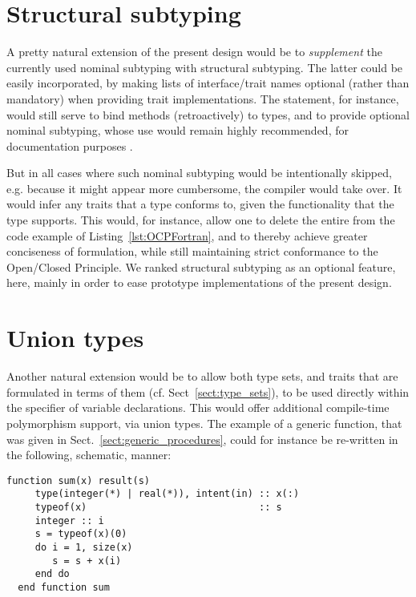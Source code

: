 \documentclass[11pt,oneside]{report}
\newcommand{\code}[1]{{\selectfont\ttfamily{#1}}}
\begin{document}
\section{Structural subtyping}
\label{sect:structural_subtyping}

A pretty natural extension of the present design would be to
\emph{supplement} the currently used nominal subtyping with
structural subtyping. The latter could be easily incorporated, by
making lists of interface/trait names optional (rather than mandatory)
when providing trait implementations. The \code{implements} statement,
for instance, would still serve to bind methods (retroactively) to
types, and to provide optional nominal subtyping, whose use would
remain highly recommended, for documentation purposes \cite{MojoRef}.

But in all cases where such nominal subtyping would be intentionally
skipped, e.g. because it might appear more cumbersome, the compiler
would take over. It would infer any traits that a type conforms to,
given the functionality that the type supports. This would, for
instance, allow one to delete the entire \code{module intrinsics} from
the code example of Listing~\ref{lst:OCPFortran}, and to thereby
achieve greater conciseness of formulation, while still maintaining
strict conformance to the Open/Closed Principle. We ranked structural
subtyping as an optional feature, here, mainly in order to ease
prototype implementations of the present design.

\section{Union types}
\label{sect:union_types}

Another natural extension would be to allow both type sets, and
traits that are formulated in terms of them
(cf. Sect~\ref{sect:type_sets}), to be used directly within the
\code{type} specifier of variable declarations. This would offer
additional compile-time polymorphism support, via union types. The
example of a generic \code{sum} function, that was given in
Sect.~\ref{sect:generic_procedures}, could for instance be re-written
in the following, schematic, manner:
\begin{lstlisting}[language=LFortran,style=boxed]
  function sum(x) result(s)
     type(integer(*) | real(*)), intent(in) :: x(:)
     typeof(x)                              :: s
     integer :: i
     s = typeof(x)(0)
     do i = 1, size(x)
        s = s + x(i)
     end do
  end function sum
\end{lstlisting}
\end{document}
